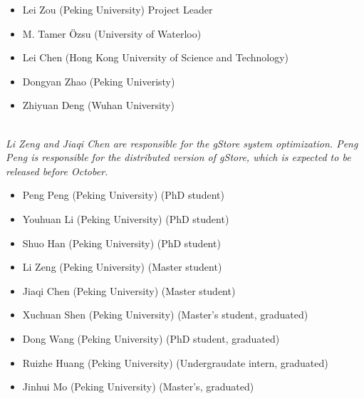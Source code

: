 \documentclass[titlepage, a4paper, 12pt]{article}
\begin{document}
\begin{itemize}
\item
  Lei Zou (Peking University) Project Leader
\item
  M. Tamer {\"O}zsu (University of Waterloo)
\item
  Lei Chen (Hong Kong University of Science and Technology)
\item
  Dongyan Zhao (Peking Univeristy)
\item 
  Zhiyuan Deng (Wuhan University)
\end{itemize}


\quad \\

\textit{Li Zeng and Jiaqi Chen are responsible for the gStore system optimization. Peng Peng is responsible for the distributed version of gStore, which is expected to be released before October.}

\begin{itemize}
\item
  Peng Peng (Peking University) (PhD student)
\item
  Youhuan Li (Peking University) (PhD student)
\item
  Shuo Han (Peking University) (PhD student)
\item
  Li Zeng (Peking University) (Master student)
\item
  Jiaqi Chen (Peking University) (Master student)
\end{itemize}


\begin{itemize}
\item
  Xuchuan Shen (Peking University) (Master's student, graduated)
\item
  Dong Wang (Peking University) (PhD student, graduated)
\item
  Ruizhe Huang (Peking University) (Undergraudate intern, graduated)
\item
  Jinhui Mo (Peking University) (Master's, graduated)
\end{itemize}
\end{document}
